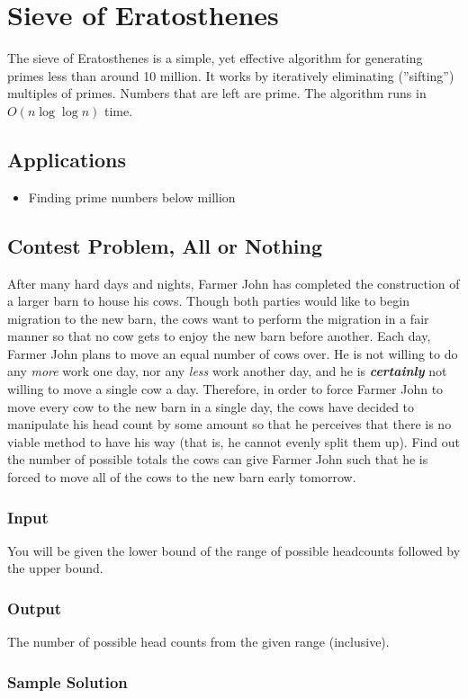 \section{Sieve of Eratosthenes}
The sieve of Eratosthenes is a simple, yet effective algorithm for generating primes less than around 10 million.
It works by iteratively eliminating (''sifting'') multiples of primes.
Numbers that are left are prime.
The algorithm runs in $O(n\log\log n)$ time.

\subsection{Applications}
\begin{itemize}
	\item	Finding prime numbers below  million
\end{itemize}

\subsection{Contest Problem, All or Nothing}
After many hard days and nights, Farmer John has completed the construction of a larger barn to house his cows.
Though both parties would like to begin migration to the new barn, the cows want to perform the migration in a fair manner so that no cow gets to enjoy the new barn before another.
Each day, Farmer John plans to move an equal number of cows over.
He is not willing to do any \textit{more} work one day, nor any \textit{less} work another day, and he is \textbf{\textit{certainly}} not willing to move a single cow a day.
Therefore, in order to force Farmer John to move every cow to the new barn in a single day, the cows have decided to manipulate his head count by some amount so that he perceives that there is no viable method to have his way (that is, he cannot evenly split them up).
Find out the number of possible totals the cows can give Farmer John such that he is forced to move all of the cows to the new barn early tomorrow.

\subsubsection{Input}
You will be given the lower bound of the range of possible headcounts followed by the upper bound.


\subsubsection{Output}
The number of possible head counts from the given range (inclusive).


\subsubsection{Sample Solution}

